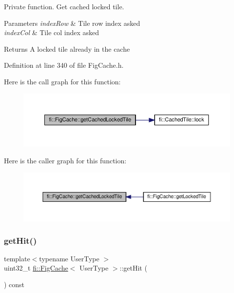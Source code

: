 Private function. Get cached locked tile. 


\begin{DoxyParams}{Parameters}
{\em index\+Row} & Tile row index asked \\
\hline
{\em index\+Col} & Tile col index asked \\
\hline
\end{DoxyParams}
\begin{DoxyReturn}{Returns}
A locked tile already in the cache 
\end{DoxyReturn}


Definition at line 340 of file Fig\+Cache.\+h.

Here is the call graph for this function\+:
\nopagebreak
\begin{figure}[H]
\begin{center}
\leavevmode
\includegraphics[width=350pt]{d7/d31/classfi_1_1FigCache_affc8808f55b290811485aecef22573e6_cgraph}
\end{center}
\end{figure}
Here is the caller graph for this function\+:
\nopagebreak
\begin{figure}[H]
\begin{center}
\leavevmode
\includegraphics[width=350pt]{d7/d31/classfi_1_1FigCache_affc8808f55b290811485aecef22573e6_icgraph}
\end{center}
\end{figure}
\mbox{\label{classfi_1_1FigCache_a112e5ccf7834108682982dd4666a9bcb}} 
\subsubsection{\texorpdfstring{get\+Hit()}{getHit()}}
{\footnotesize\ttfamily template$<$typename User\+Type $>$ \\
uint32\+\_\+t \hyperlink{classfi_1_1FigCache}{fi\+::\+Fig\+Cache}$<$ User\+Type $>$\+::get\+Hit (\begin{DoxyParamCaption}{ }\end{DoxyParamCaption}) const\hspace{0.3cm}{\ttfamily [inline]}}


